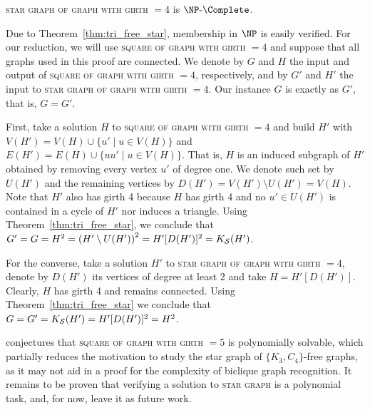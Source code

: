 \begin{theorem}
    \textsc{star graph of graph with girth $= 4$} is $\NPc$.
\end{theorem}

\begin{tproof}
    Due to Theorem~\ref{thm:tri_free_star}, membership in $\NP$ is easily verified.
    For our reduction, we will use \textsc{square of graph with girth $= 4$} and suppose that all graphs used in this proof are connected.
    We denote by $G$ and $H$ the input and output of \textsc{square of graph with girth $= 4$}, respectively, and by $G'$ and $H'$ the input to \textsc{star graph of graph with girth $= 4$}.
    Our instance $G$ is exactly as $G'$, that is, $G = G'$.
    
    First, take a solution $H$ to \textsc{square of graph with girth $= 4$} and build $H'$ with $V(H') = V(H) \cup \{u' \mid u \in V(H)\}$ and $E(H') = E(H) \cup \{uu' \mid u \in V(H)\}$.
    That is, $H$ is an induced subgraph of $H'$ obtained by removing every vertex $u'$ of degree one.
    We denote such set by $U(H')$ and the remaining vertices by $D(H') = V(H') \setminus U(H') = V(H)$.
    Note that $H'$ also has girth 4 because $H$ has girth 4 and no $u' \in U(H')$ is contained in a cycle of $H'$ nor induces a triangle.
    Using Theorem~\ref{thm:tri_free_star}, we conclude that $G' = G = H^2 = \left(H' \setminus U(H')\right)^2 = H'[D(H')]^2 = K_{\mathcal{S}}(H')$.
    
    For the converse, take a solution $H'$ to \textsc{star graph of graph with girth $= 4$}, denote by $D(H')$ its vertices of degree at least 2 and take $H = H'[D(H')]$.
    Clearly, $H$ has girth 4 and remains connected.
    Using Theorem~\ref{thm:tri_free_star} we conclude that $G = G' = K_{\mathcal{S}}(H') = H'[D(H')]^2 = H^2$.
\end{tproof}


\citep{girth_powers} conjectures that \textsc{square of graph with girth $= 5$} is polynomially solvable, which partially reduces the motivation to study the star graph of $\{K_3, C_4\}$-free graphs, as it may not aid in a proof for the complexity of biclique graph recognition.
It remains to be proven that verifying a solution to \textsc{star graph} is a polynomial task, and, for now, leave it as future work.